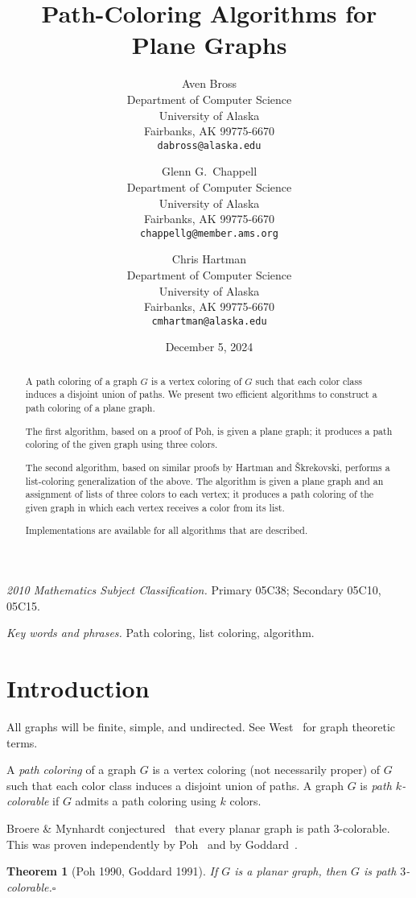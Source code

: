 \documentclass[12pt,letterpaper]{article}
\date{December 5, 2024}
\title{Path-Coloring Algorithms for Plane Graphs}
\author{Aven Bross\\
\small Department of Computer Science\\
\small University of Alaska\\
\small Fairbanks, AK 99775-6670\\
\small\texttt{dabross@alaska.edu} \and
Glenn G.~Chappell\\
\small Department of Computer Science\\
\small University of Alaska\\
\small Fairbanks, AK 99775-6670\\
\small\texttt{chappellg{@}member.ams.org} \and
Chris Hartman\\
\small Department of Computer Science\\
\small University of Alaska\\
\small Fairbanks, AK 99775-6670\\
\small\texttt{cmhartman{@}alaska.edu}}
\theoremstyle{plain}
\newtheorem{theorem}[lemma]{Theorem}         %
\theoremstyle{definition}
\theoremstyle{break}
\newcommand{\ggcqedsymbol}{$\square$}
\newcommand{\ggcqed}{\hbox{}\nobreak\hbox{\quad\ggcqedsymbol}}
\newcommand{\ggcnopf}{\ggcqed}
\newcommand{\defterm}[1]{\emph{#1}} %
\newcommand{\abstdefterm}[1]{#1} %
\begin{document}
\maketitle
\centerline{\small \textit{2010 Mathematics Subject Classification.}
 Primary 05C38; Secondary 05C10, 05C15.}
\centerline{\small \textit{Key words and phrases.}
 Path coloring, list coloring, algorithm.}

\begin{abstract}
A \abstdefterm{path coloring} of a graph $G$ is a vertex coloring
of $G$ such that each color class induces a disjoint union of paths.
We present two efficient algorithms
to construct a path coloring of a plane graph.

The first algorithm, based on a proof of Poh, %
is given a plane graph;
it produces a path coloring of the given graph
using three colors.

The second algorithm,
based on similar proofs
by Hartman %
and \v{S}krekovski, %
performs a list-coloring generalization of the above.
The algorithm is given a plane graph and an assignment of lists of
three colors to each vertex;
it produces a path coloring of the given graph
in which each vertex receives a color from its list.

Implementations are available for all algorithms that are described.
\end{abstract}

\section{Introduction}

All graphs will be finite, simple, and undirected.
See West~\cite{Wes2000} for graph theoretic terms.

A \defterm{path coloring} of a graph $G$ is a vertex coloring
(not necessarily proper) of $G$ such that each color class induces
a disjoint union of paths.
A graph $G$ is \defterm{path $k$-colorable} if $G$
admits a path coloring using $k$ colors.

Broere \& Mynhardt conjectured~\cite[Conj.~16]{BrMy1985}
that every planar graph is path $3$-colorable.
This was proven independently by Poh~\cite[Thm.~2]{Poh1990}
and by Goddard~\cite[Thm.~1]{God1991}.

\begin{theorem}[Poh 1990, Goddard 1991]\label{T:planar3c}
If $G$ is a planar graph,
then $G$ is path $3$-colorable.\ggcnopf\end{theorem}
\end{document}
